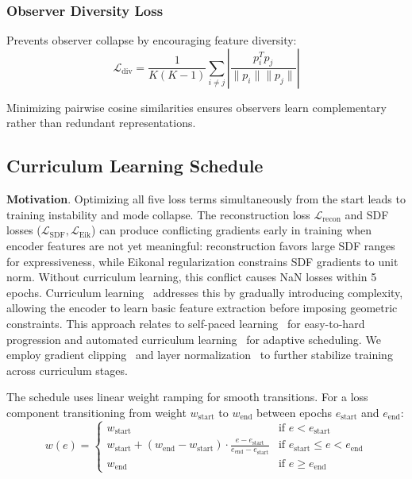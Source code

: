 \documentclass[10pt,twocolumn,letterpaper]{article}
\begin{document}
\subsubsection{Observer Diversity Loss}
\label{sec:loss_div}

Prevents observer collapse by encouraging feature diversity:
\begin{equation}
\mathcal{L}_{\text{div}} = \frac{1}{K(K-1)} \sum_{i \neq j} \left| \frac{p_i^T p_j}{\|p_i\| \|p_j\|} \right|
\end{equation}

Minimizing pairwise cosine similarities ensures observers learn complementary rather than redundant representations.

\subsection{Curriculum Learning Schedule}
\label{sec:curriculum}

\textbf{Motivation}. Optimizing all five loss terms simultaneously from the start leads to training instability and mode collapse. The reconstruction loss $\mathcal{L}_{\text{recon}}$ and SDF losses ($\mathcal{L}_{\text{SDF}}, \mathcal{L}_{\text{Eik}}$) can produce conflicting gradients early in training when encoder features are not yet meaningful: reconstruction favors large SDF ranges for expressiveness, while Eikonal regularization constrains SDF gradients to unit norm. Without curriculum learning, this conflict causes NaN losses within 5 epochs. Curriculum learning~\cite{bengio2009curriculum} addresses this by gradually introducing complexity, allowing the encoder to learn basic feature extraction before imposing geometric constraints. This approach relates to self-paced learning~\cite{kumar2010selfpaced} for easy-to-hard progression and automated curriculum learning~\cite{graves2017automated} for adaptive scheduling. We employ gradient clipping~\cite{pascanu2013gradient} and layer normalization~\cite{ba2016layer} to further stabilize training across curriculum stages.

The schedule uses linear weight ramping for smooth transitions. For a loss component transitioning from weight $w_{\text{start}}$ to $w_{\text{end}}$ between epochs $e_{\text{start}}$ and $e_{\text{end}}$:
\begin{equation}
w(e) = \begin{cases}
w_{\text{start}} & \text{if } e < e_{\text{start}} \\
w_{\text{start}} + (w_{\text{end}} - w_{\text{start}}) \cdot \frac{e - e_{\text{start}}}{e_{\text{end}} - e_{\text{start}}} & \text{if } e_{\text{start}} \leq e < e_{\text{end}} \\
w_{\text{end}} & \text{if } e \geq e_{\text{end}}
\end{cases}
\end{equation}
\end{document}
